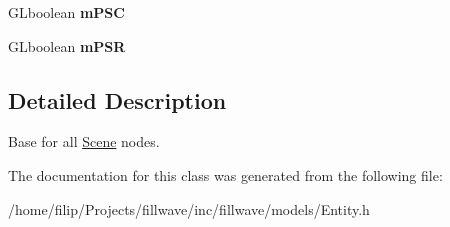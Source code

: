 \begin{DoxyCompactItemize}
\item 
\hypertarget{classfillwave_1_1models_1_1Entity_a774a4749e0f234ce0c6d064b48500530}{}G\+Lboolean {\bfseries m\+P\+S\+C}\label{classfillwave_1_1models_1_1Entity_a774a4749e0f234ce0c6d064b48500530}

\item 
\hypertarget{classfillwave_1_1models_1_1Entity_a52025db4b7358d48995069c91ccd31a0}{}G\+Lboolean {\bfseries m\+P\+S\+R}\label{classfillwave_1_1models_1_1Entity_a52025db4b7358d48995069c91ccd31a0}

\end{DoxyCompactItemize}


\subsection{Detailed Description}
Base for all \hyperlink{classfillwave_1_1models_1_1Scene}{Scene} nodes. 

The documentation for this class was generated from the following file\+:\begin{DoxyCompactItemize}
\item 
/home/filip/\+Projects/fillwave/inc/fillwave/models/Entity.\+h\end{DoxyCompactItemize}
